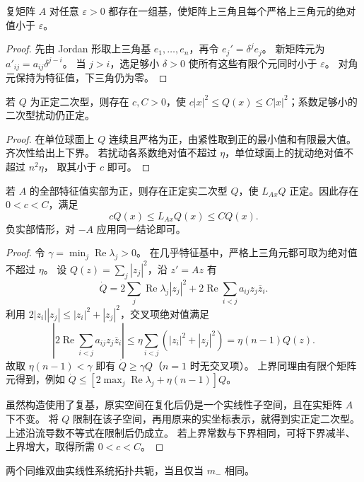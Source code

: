 \begin{lemma}[几乎特征基]
复矩阵 $A$ 对任意 $\varepsilon>0$ 都存在一组基，使矩阵上三角且每个严格上三角元的绝对值小于 $\varepsilon$。
\end{lemma}
\begin{proof}
先由 Jordan 形取上三角基 $e_1,\ldots,e_n$，再令 $e_j'=\delta^je_j$。
新矩阵元为 $a'_{ij}=a_{ij}\delta^{j-i}$。
当 $j>i$，选足够小 $\delta>0$ 使所有这些有限个元同时小于 $\varepsilon$。
对角元保持为特征值，下三角仍为零。
\end{proof}
\begin{lemma}[正定二次型的开性]
若 $Q$ 为正定二次型，则存在 $c,C>0$，使
$c|x|^2\leq Q(x)\leq C|x|^2$；系数足够小的二次型扰动仍正定。
\end{lemma}
\begin{proof}
在单位球面上 $Q$ 连续且严格为正，由紧性取到正的最小值和有限最大值。
齐次性给出上下界。
若扰动各系数绝对值不超过 $\eta$，单位球面上的扰动绝对值不超过 $n^2\eta$，
取其小于 $c$ 即可。
\end{proof}
\begin{theorem}[Lyapunov 椭球]
若 $A$ 的全部特征值实部为正，则存在正定实二次型 $Q$，使
$L_{Ax}Q$ 正定。因此存在 $0<c<C$，满足
\[
 cQ(x)\leq L_{Ax}Q(x)\leq CQ(x).
\]
负实部情形，对 $-A$ 应用同一结论即可。
\end{theorem}
\begin{proof}
令 $\gamma=\min_j\operatorname{Re}\lambda_j>0$。
在几乎特征基中，严格上三角元都可取为绝对值不超过 $\eta$。
设 $Q(z)=\sum_j|z_j|^2$，沿 $z'=Az$ 有
\[
 \dot Q=2\sum_j\operatorname{Re}\lambda_j|z_j|^2
 +2\operatorname{Re}\sum_{i<j}a_{ij}z_j\overline z_i.
\]
利用 $2|z_i||z_j|\leq|z_i|^2+|z_j|^2$，交叉项绝对值满足
\[
 \left|2\operatorname{Re}\sum_{i<j}a_{ij}z_j\overline z_i\right|
 \leq\eta\sum_{i<j}(|z_i|^2+|z_j|^2)
 =\eta(n-1)Q(z).
\]
故取 $\eta(n-1)<\gamma$ 即有 $\dot Q\geq\gamma Q$（$n=1$ 时无交叉项）。
上界同理由有限个矩阵元得到，例如
$\dot Q\leq[2\max_j\operatorname{Re}\lambda_j+\eta(n-1)]Q$。

虽然构造使用了复基，原实空间在复化后仍是一个实线性子空间，且在实矩阵 $A$ 下不变。
将 $Q$ 限制在该子空间，再用原来的实坐标表示，就得到实正定二次型。
上述沿流导数不等式在限制后仍成立。
若上界常数与下界相同，可将下界减半、上界增大，取得所需 $0<c<C$。
\end{proof}
\begin{theorem}[双曲线性系统的拓扑分类]\label{thm:arnold-linear-topology}
两个同维双曲实线性系统拓扑共轭，当且仅当 $m_-$ 相同。
\end{theorem}
